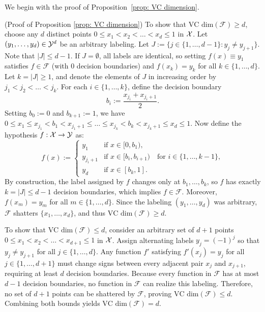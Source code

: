 We begin with the proof of Proposition~\ref{prop: VC dimension}.

\begin{apdxproof}(Proof of Proposition \ref{prop: VC dimension})\label{proof:VC_dimension}
To show that $\text{VC dim}(\mathcal{F}) \geq d$, choose any $d$ distinct points $0 \leq x_1 < x_2 < \dots < x_d \leq 1$ in $\mathcal{X}$. Let $(y_1, \dots, y_d) \in \mathcal{Y}^d$ be an arbitrary labeling.
Let $J := \{j \in \{1, \dots, d-1\} : y_j \neq y_{j+1}\}$. Note that $|J| \leq d-1$.
If $J = \emptyset$, all labels are identical, so setting $f(x) \equiv y_1$ satisfies $f \in \mathcal{F}$ (with $0$ decision boundaries) and $f(x_k) = y_k$ for all $k \in \{1, \dots, d\}$.
Let $k = |J| \geq 1$, and denote the elements of $J$ in increasing order by $j_1 < j_2 < \dots < j_k$. For each $i \in \{1, \dots, k\}$, define the decision boundary
\[
b_i := \frac{x_{j_i} + x_{j_i+1}}{2}.
\]
Setting $b_0 := 0$ and $b_{k+1} := 1$, we have $0 \leq x_1 \leq x_{j_1} < b_1 < x_{j_1+1} \leq \dots \leq x_{j_k} < b_k < x_{j_k+1} \leq x_d \leq 1$. Now define the hypothesis $f: \mathcal{X} \rightarrow \mathcal{Y}$ as:
\[
f(x) := 
\begin{cases}
    y_1 &\text{if } x \in [0, b_1),\\
    y_{j_i+1} &\text{if } x \in [b_i, b_{i+1}) \quad \text{for } i \in \{1, \dots, k-1\},\\    
    y_d &\text{if } x \in [b_k, 1].
\end{cases}
\]
By construction, the label assigned by $f$ changes only at $b_1, \dots, b_k$, so $f$ has exactly $k = |J| \leq d-1$ decision boundaries, which implies $f \in \mathcal{F}$. Moreover, $f(x_m) = y_m$ for all $m \in \{1, \dots, d\}$. Since the labeling $(y_1, \dots, y_d)$ was arbitrary, $\mathcal{F}$ shatters $\{x_1, \dots, x_d\}$, and thus $\text{VC dim}(\mathcal{F}) \geq d$.

To show that $\text{VC dim}(\mathcal{F}) \leq d$, consider an arbitrary set of $d+1$ points $0 \leq x_1 < x_2 < \dots < x_{d+1} \leq 1$ in $\mathcal{X}$. Assign alternating labels $y_j = (-1)^j$ so that $y_j \neq y_{j+1}$ for all $j \in \{1, \dots, d\}$. Any function $f'$ satisfying $f'(x_j) = y_j$ for all $j \in \{1, \dots, d+1\}$ must change signs between every adjacent pair $x_j$ and $x_{j+1}$, requiring at least $d$ decision boundaries. Because every function in $\mathcal{F}$ has at most $d-1$ decision boundaries, no function in $\mathcal{F}$ can realize this labeling. Therefore, no set of $d+1$ points can be shattered by $\mathcal{F}$, proving $\text{VC dim}(\mathcal{F}) \leq d$. Combining both bounds yields $\text{VC dim}(\mathcal{F}) = d$.
\end{apdxproof}

